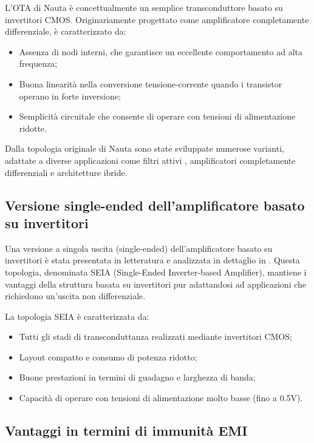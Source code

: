 L'OTA di Nauta è concettualmente un semplice transconduttore basato su invertitori CMOS. Originariamente progettato come amplificatore completamente differenziale, è caratterizzato da:

\begin{itemize}
   \item Assenza di nodi interni, che garantisce un eccellente comportamento ad alta frequenza;
   \item Buona linearità nella conversione tensione-corrente quando i transistor operano in forte inversione;
   \item Semplicità circuitale che consente di operare con tensioni di alimentazione ridotte.
\end{itemize}

Dalla topologia originale di Nauta sono state sviluppate numerose varianti, adattate a diverse applicazioni come filtri attivi \cite{EMI_Immunity_of_the_Nauta_Inverter-Based_Amplifier}, amplificatori completamente differenziali e architetture ibride.

\subsection{Versione single-ended dell'amplificatore basato su invertitori}

Una versione a singola uscita (single-ended) dell'amplificatore basato su invertitori è stata presentata in letteratura e analizzata in dettaglio in \cite{EMI_Immunity_of_the_Nauta_Inverter-Based_Amplifier}. Questa topologia, denominata SEIA (Single-Ended Inverter-based Amplifier), mantiene i vantaggi della struttura basata su invertitori pur adattandosi ad applicazioni che richiedono un'uscita non differenziale.

La topologia SEIA è caratterizzata da:
\begin{itemize}
   \item Tutti gli stadi di transconduttanza realizzati mediante invertitori CMOS;
   \item Layout compatto e consumo di potenza ridotto;
   \item Buone prestazioni in termini di guadagno e larghezza di banda;
   \item Capacità di operare con tensioni di alimentazione molto basse (fino a 0.5V).
\end{itemize}

\subsection{Vantaggi in termini di immunità EMI}

